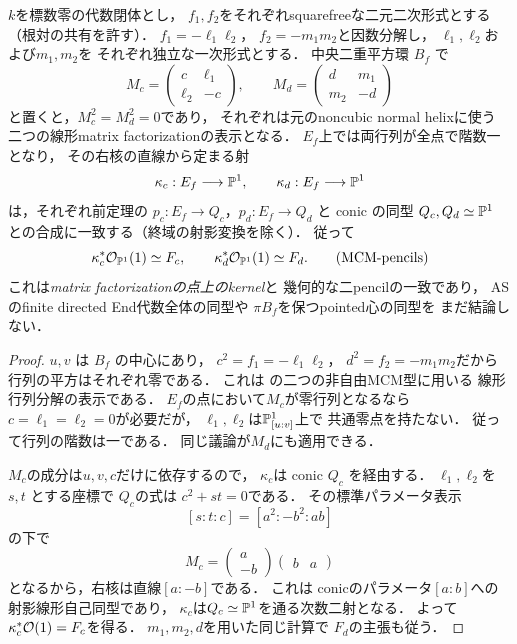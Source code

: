 \begin{proposition}[非自由MCM二型の行列核は点曲線の二pencilを回収する]
\label{prop:qa-point-mcm-matrix-pencils}
$k$を標数零の代数閉体とし，
$f_1,f_2$をそれぞれsquarefreeな二元二次形式とする
（根対の共有を許す）．
$f_1=-\ell_1\ell_2$，
$f_2=-m_1m_2$と因数分解し，
$\ell_1,\ell_2$および$m_1,m_2$を
それぞれ独立な一次形式とする．
中央二重平方環 $B_f$ で
\[
 M_c=\begin{pmatrix}c&\ell_1\\\ell_2&-c\end{pmatrix},
 \qquad
 M_d=\begin{pmatrix}d&m_1\\m_2&-d\end{pmatrix}
 \tag{MCM-matrices}\label{eq:qa-point-mcm-matrices}
\]
と置くと，$M_c^2=M_d^2=0$であり，
それぞれは元のnoncubic normal helixに使う
二つの線形matrix factorizationの表示となる．
$E_f$上では両行列が全点で階数一となり，
その右核の直線から定まる射
\[
 \kappa_c:E_f\longrightarrow\mathbb P^1,\qquad
 \kappa_d:E_f\longrightarrow\mathbb P^1
\]
は，それぞれ前定理の
$p_c:E_f\to Q_c$，$p_d:E_f\to Q_d$
と conic の同型 $Q_c,Q_d\simeq\mathbb P^1$
との合成に一致する（終域の射影変換を除く）．
従って
\[
 \kappa_c^*\mathcal O_{\mathbb P^1}(1)\simeq F_c,\qquad
 \kappa_d^*\mathcal O_{\mathbb P^1}(1)\simeq F_d .
 \tag{MCM-pencils}\label{eq:qa-point-mcm-pencil-classes}
\]
これは\emph{matrix factorizationの点上のkernel}と
幾何的な二pencilの一致であり，
ASのfinite directed End代数全体の同型や
$\pi B_f$を保つpointed心の同型を
まだ結論しない．
\end{proposition}
\begin{proof}
$u,v$ は $B_f$ の中心にあり，
$c^2=f_1=-\ell_1\ell_2$，
$d^2=f_2=-m_1m_2$だから
行列の平方はそれぞれ零である．
これは
\cite[\texttt{thm:ore-anticommuting-central}]{QuadricIntrinsic2026}
の二つの非自由MCM型に用いる
線形行列分解の表示である．
$E_f$の点において$M_c$が零行列となるなら
$c=\ell_1=\ell_2=0$が必要だが，
$\ell_1,\ell_2$は$\mathbb P^1_{[u:v]}$上で
共通零点を持たない．
従って行列の階数は一である．
同じ議論が$M_d$にも適用できる．

$M_c$の成分は$u,v,c$だけに依存するので，
$\kappa_c$は conic $Q_c$ を経由する．
$\ell_1,\ell_2$を $s,t$ とする座標で
$Q_c$の式は $c^2+st=0$である．
その標準パラメータ表示
\[
 [s:t:c]=[a^2:-b^2:ab]
\]
の下で
\[
 M_c=
 \begin{pmatrix}a\\-b\end{pmatrix}
 \begin{pmatrix}b&a\end{pmatrix}
\]
となるから，右核は直線$[a:-b]$である．
これは conicのパラメータ$[a:b]$への
射影線形自己同型であり，
$\kappa_c$は$Q_c\simeq\mathbb P^1$を通る次数二射となる．
よって$\kappa_c^*\mathcal O(1)=F_c$を得る．
$m_1,m_2,d$を用いた同じ計算で
$F_d$の主張も従う．
\end{proof}

